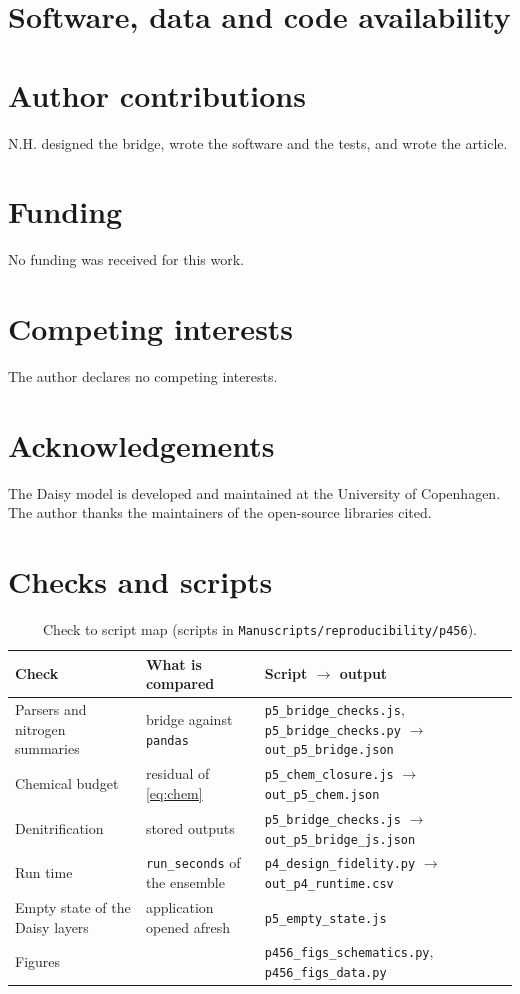 \section*{Software, data and code availability}
\suiteavail
\section*{Author contributions}
N.H. designed the bridge, wrote the software and the tests, and wrote the article.
\section*{Funding}
No funding was received for this work.
\section*{Competing interests}
The author declares no competing interests.

\section*{Acknowledgements}
The Daisy model is developed and maintained at the University of Copenhagen. The author thanks the maintainers of the open-source libraries cited.



\appendix
\section{Checks and scripts}\label{app:repro5}
\begin{table}[H]\centering\small
\caption{Check to script map (scripts in \texttt{Manuscripts/reproducibility/p456}).}
\begin{tabularx}{\textwidth}{>{\raggedright\arraybackslash}p{4.6cm}>{\raggedright\arraybackslash}p{4.0cm}X}
\toprule Check & What is compared & Script $\to$ output\\\midrule
Parsers and nitrogen summaries & bridge against \texttt{pandas} & \texttt{p5\_bridge\_checks.js}, \texttt{p5\_bridge\_checks.py} $\to$ \texttt{out\_p5\_bridge.json}\\
Chemical budget & residual of \cref{eq:chem} & \texttt{p5\_chem\_closure.js} $\to$ \texttt{out\_p5\_chem.json}\\
Denitrification & 792 stored outputs & \texttt{p5\_bridge\_checks.js} $\to$ \texttt{out\_p5\_bridge\_js.json}\\
Run time & \texttt{run\_seconds} of the ensemble & \texttt{p4\_design\_fidelity.py} $\to$ \texttt{out\_p4\_runtime.csv}\\
Empty state of the Daisy layers & application opened afresh & \texttt{p5\_empty\_state.js}\\
Figures & & \texttt{p456\_figs\_schematics.py}, \texttt{p456\_figs\_data.py}\\\bottomrule
\end{tabularx}
\end{table}

